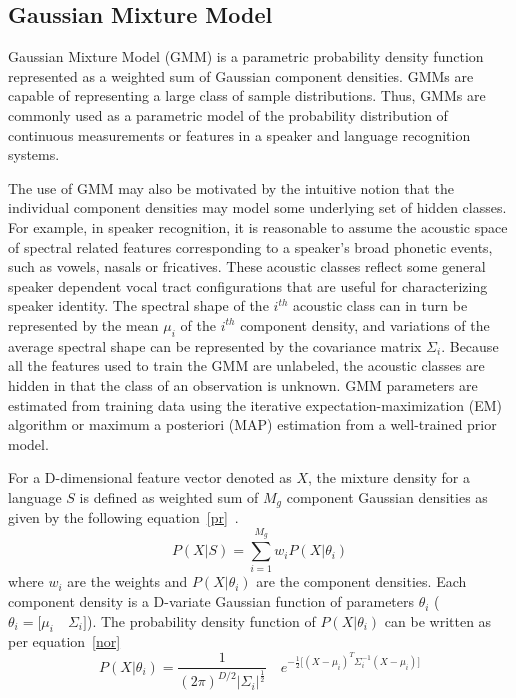 \begin{spacing}{1.5}
\section{Gaussian Mixture Model}
\label{gmm_sc}
Gaussian Mixture Model (GMM) is a parametric probability density function represented as a weighted sum of Gaussian component densities. GMMs are capable of representing a large class of sample distributions. Thus, GMMs are commonly used as a parametric model of the probability distribution of continuous measurements or features in a speaker and language recognition systems. 

The use of GMM may also be motivated by the intuitive notion that the individual component densities may model some underlying set of hidden classes. For example, in speaker recognition, it is reasonable to assume the acoustic space of spectral related features corresponding to a speaker’s broad phonetic events, such as vowels, nasals or fricatives. These acoustic classes reflect some general speaker dependent vocal tract configurations that are useful for characterizing speaker identity. The spectral shape of the $i^{th}$ acoustic class can in turn be
represented by the mean $\mu_{i}$ of the $i^{th}$ component density, and variations of the average spectral shape can be represented by the covariance matrix $\Sigma_{i}$. Because all the features used to train the GMM are unlabeled, the acoustic classes are hidden in that the class of an observation is unknown.  GMM parameters are estimated from training data using the iterative expectation-maximization (EM) algorithm or maximum a posteriori (MAP) estimation from a well-trained prior model.

For a D-dimensional feature vector denoted as $X$, the mixture density for a language $S$ is defined as weighted sum of $M_{g}$ component Gaussian densities as given by the following equation~\ref{pr}~\cite{reynolds1995speaker}.
\begin{equation}
\label{pr}
 P(X|S)=\sum_{i=1}^{M_{g}}w_{i}P(X|\theta_{i})
\end{equation} 
where $w_{i}$ are the weights and $P(X|\theta_{i})$ are the component densities. Each component density is a D-variate Gaussian function of parameters $\theta_{i}$ ( $\theta_{i} = \bigg[\mu_{i} \quad  \Sigma_{i}\bigg]$). The probability density function of $P(X|\theta_{i})$ can be written as per equation~\ref{nor} 
\begin{equation}
\label{nor}
 P(X|\theta_{i})=\frac{1}{(2 \pi)^{D/2} |\Sigma_{i}|^{\frac{1}{2}}} \quad e^{-\frac{1}{2}\bigg[(X-\mu_{i})^{T}\Sigma_{i}^{-1}(X-\mu_{i})\bigg]}
\end{equation} 


\end{spacing}
